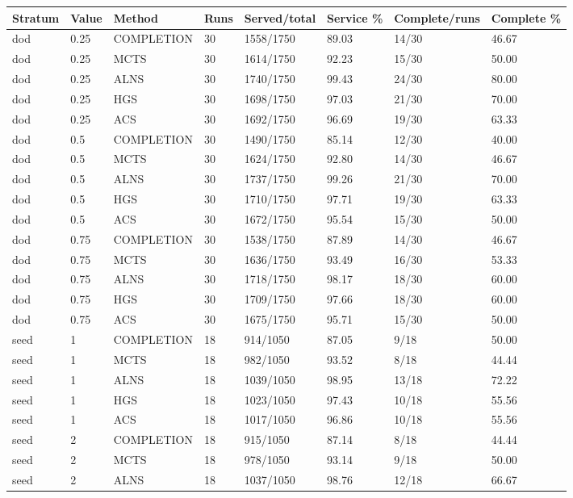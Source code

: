 \begin{tabular}{llllllll}
\hline
Stratum & Value & Method & Runs & Served/total & Service \% & Complete/runs & Complete \% \\
\hline
dod & 0.25 & COMPLETION & 30 & 1558/1750 & 89.03 & 14/30 & 46.67 \\
dod & 0.25 & MCTS & 30 & 1614/1750 & 92.23 & 15/30 & 50.00 \\
dod & 0.25 & ALNS & 30 & 1740/1750 & 99.43 & 24/30 & 80.00 \\
dod & 0.25 & HGS & 30 & 1698/1750 & 97.03 & 21/30 & 70.00 \\
dod & 0.25 & ACS & 30 & 1692/1750 & 96.69 & 19/30 & 63.33 \\
dod & 0.5 & COMPLETION & 30 & 1490/1750 & 85.14 & 12/30 & 40.00 \\
dod & 0.5 & MCTS & 30 & 1624/1750 & 92.80 & 14/30 & 46.67 \\
dod & 0.5 & ALNS & 30 & 1737/1750 & 99.26 & 21/30 & 70.00 \\
dod & 0.5 & HGS & 30 & 1710/1750 & 97.71 & 19/30 & 63.33 \\
dod & 0.5 & ACS & 30 & 1672/1750 & 95.54 & 15/30 & 50.00 \\
dod & 0.75 & COMPLETION & 30 & 1538/1750 & 87.89 & 14/30 & 46.67 \\
dod & 0.75 & MCTS & 30 & 1636/1750 & 93.49 & 16/30 & 53.33 \\
dod & 0.75 & ALNS & 30 & 1718/1750 & 98.17 & 18/30 & 60.00 \\
dod & 0.75 & HGS & 30 & 1709/1750 & 97.66 & 18/30 & 60.00 \\
dod & 0.75 & ACS & 30 & 1675/1750 & 95.71 & 15/30 & 50.00 \\
seed & 1 & COMPLETION & 18 & 914/1050 & 87.05 & 9/18 & 50.00 \\
seed & 1 & MCTS & 18 & 982/1050 & 93.52 & 8/18 & 44.44 \\
seed & 1 & ALNS & 18 & 1039/1050 & 98.95 & 13/18 & 72.22 \\
seed & 1 & HGS & 18 & 1023/1050 & 97.43 & 10/18 & 55.56 \\
seed & 1 & ACS & 18 & 1017/1050 & 96.86 & 10/18 & 55.56 \\
seed & 2 & COMPLETION & 18 & 915/1050 & 87.14 & 8/18 & 44.44 \\
seed & 2 & MCTS & 18 & 978/1050 & 93.14 & 9/18 & 50.00 \\
seed & 2 & ALNS & 18 & 1037/1050 & 98.76 & 12/18 & 66.67 \\

\end{tabular}
